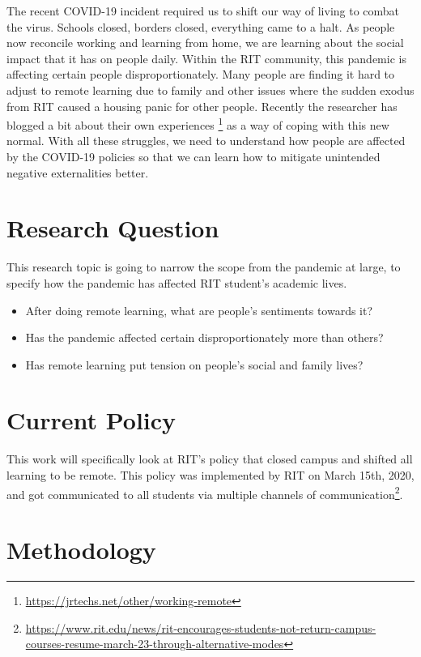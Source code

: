 \documentclass[12pt,
 reprint,
nofootinbib,
 amsmath,amssymb,
 aps,
floatfix,
]{revtex4-2}
\begin{document}
The recent COVID-19 incident required us to shift our way of living to combat the virus. Schools closed, borders closed, everything came to a halt. As people now reconcile working and learning from home, we are learning about the social impact that it has on people daily. Within the RIT community, this pandemic is affecting certain people disproportionately. Many people are finding it hard to adjust to remote learning due to family and other issues where the sudden exodus from RIT caused a housing panic for other people. Recently the researcher has blogged a bit about their own experiences \footnote{\url{https://jrtechs.net/other/working-remote}} as a way of coping with this new normal. With all these struggles, we need to understand how people are affected by the COVID-19 policies so that we can learn how to mitigate unintended negative externalities better. 

\section{Research Question}

This research topic is going to narrow the scope from the pandemic at large, to specify how the pandemic has affected RIT student's academic lives.

\begin{itemize}
    \item After doing remote learning, what are people's sentiments towards it?
    \item Has the pandemic affected certain disproportionately more than others?
    \item Has remote learning put tension on people's social and family lives?
\end{itemize}

\section{Current Policy}

This work will specifically look at RIT's policy that closed campus and shifted all learning to be remote. This policy was implemented by RIT on March 15th, 2020, and got communicated to all students via multiple channels of communication\footnote{\url{https://www.rit.edu/news/rit-encourages-students-not-return-campus-courses-resume-march-23-through-alternative-modes}}.

\section{Methodology}
\end{document}
